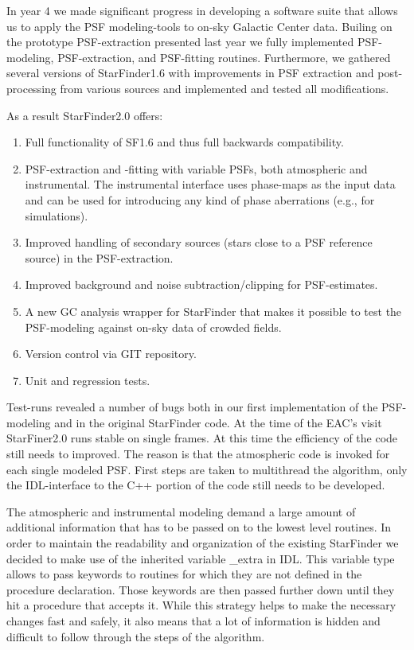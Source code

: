 In year 4 we made significant progress in developing a software suite that allows us to apply the PSF modeling-tools to on-sky Galactic Center data. Builing on the prototype PSF-extraction presented last year we fully implemented PSF-modeling, PSF-extraction, and PSF-fitting routines. Furthermore, we gathered several versions of StarFinder1.6 with improvements in PSF extraction and post-processing from various sources and implemented and tested all modifications.

As a result StarFinder2.0 offers:
\begin{enumerate}
\item Full functionality of SF1.6 and thus full backwards compatibility.
\item PSF-extraction and -fitting with variable PSFs, both atmospheric and instrumental. The instrumental interface uses phase-maps as the input data and can be used for introducing any kind of phase aberrations (e.g., for simulations).
\item Improved handling of secondary sources (stars close to a PSF reference source) in the PSF-extraction.
\item Improved background and noise subtraction/clipping for PSF-estimates.
\item A new GC analysis wrapper for StarFinder that makes it possible to test the PSF-modeling against on-sky data of crowded fields.
\item Version control via GIT repository.
\item Unit and regression tests.
\end{enumerate}
  
Test-runs revealed a number of bugs both in our first implementation of the PSF-modeling and in the original StarFinder code. At the time of the EAC's visit StarFiner2.0 runs stable on single frames. At this time the efficiency of the code still needs to improved. The reason is that the atmospheric code is invoked for each single modeled PSF. First steps are taken to multithread the algorithm, only the IDL-interface to the C++ portion of the code still needs to be developed.

The atmospheric and instrumental modeling demand a large amount of additional information that has to be passed on to the lowest level routines. In order to maintain the readability and organization of the existing StarFinder we decided to make use of the inherited variable \_extra in IDL. This variable type allows to pass keywords to routines for which they are not defined in the procedure declaration. Those keywords are then passed further down until they hit a procedure that accepts it. While this strategy helps to make the necessary changes fast and safely, it also means that a lot of information is hidden and difficult to follow through the steps of the algorithm.

